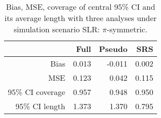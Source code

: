\documentclass[]{imsart}
\begin{document}
\begin{table}[ht]
\centering
\begin{tabular}{r|rrr }
 & Full & Pseudo & SRS \\											
  \hline
 Bias & 0.013 & -0.011 & 0.002 				\\
 MSE & 0.123 & 0.042 & 0.115                      \\
 95\% CI coverage & 0.957 & 0.948 & 0.950\\
  95\% CI length & 1.373 & 1.370 & 0.795\\

  \end{tabular}

\caption{\label{table:SLRpi-symmetric} Bias, MSE, coverage of central 95\% CI and its average length
with three analyses under simulation scenario SLR: $\pi$-symmetric.
}
\end{table}
\FloatBarrier
\end{document}

